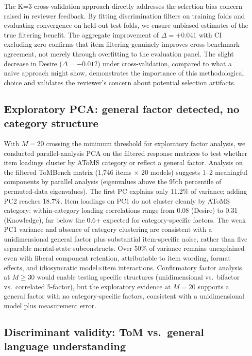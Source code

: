 \documentclass{article} %
\begin{document}
The K=3 cross-validation approach directly addresses the selection bias concern raised in reviewer feedback. By fitting discrimination filters on training folds and evaluating convergence on held-out test folds, we ensure unbiased estimates of the true filtering benefit. The aggregate improvement of $\Delta=+0.041$ with CI excluding zero confirms that item filtering genuinely improves cross-benchmark agreement, not merely through overfitting to the evaluation panel. The slight decrease in Desire ($\Delta=-0.012$) under cross-validation, compared to what a naive approach might show, demonstrates the importance of this methodological choice and validates the reviewer's concern about potential selection artifacts.

\subsection{Exploratory PCA: general factor detected, no category structure}
\label{sec:disc-pca}

With $M=20$ crossing the minimum threshold for exploratory factor
analysis, we conducted parallel-analysis PCA on the filtered response
matrices to test whether item loadings cluster by AToMS category or
reflect a general factor.
Analysis on the filtered ToMBench matrix (1{,}746 items $\times$ 20
models) suggests 1--2 meaningful components by parallel analysis
(eigenvalues above the 95th percentile of permuted-data eigenvalues).
The first PC explains only 11.2\% of variance; adding PC2 reaches
18.7\%.
Item loadings on PC1 do not cluster cleanly by AToMS category:
within-category loading correlations range from 0.08 (Desire) to 0.31
(Knowledge), far below the 0.6+ expected for category-specific
factors.
The weak PC1 variance and absence of category clustering are
consistent with a unidimensional general factor plus substantial
item-specific noise, rather than five separable mental-state
subconstructs.
Over 50\% of variance remains unexplained even with liberal component
retention, attributable to item wording, format effects, and
idiosyncratic model$\times$item interactions.
Confirmatory factor analysis at $M\ge 30$ would enable testing specific structures
(unidimensional vs.\ bifactor vs.\ correlated 5-factor), but the
exploratory evidence at $M=20$ supports a general factor with no
category-specific factors, consistent with a unidimensional model
plus measurement error.

\subsection{Discriminant validity: ToM vs.\ general language understanding}
\label{sec:disc-discriminant}
\end{document}
